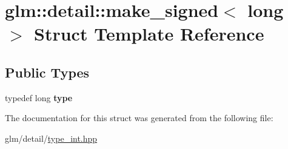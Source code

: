 \hypertarget{structglm_1_1detail_1_1make__signed_3_01long_01_4}{\section{glm\-:\-:detail\-:\-:make\-\_\-signed$<$ long $>$ Struct Template Reference}
\label{structglm_1_1detail_1_1make__signed_3_01long_01_4}
}
\subsection*{Public Types}
\begin{DoxyCompactItemize}
\item 
\hypertarget{structglm_1_1detail_1_1make__signed_3_01long_01_4_ab9807f0a681192166dd820195c967222}{typedef long {\bfseries type}}\label{structglm_1_1detail_1_1make__signed_3_01long_01_4_ab9807f0a681192166dd820195c967222}

\end{DoxyCompactItemize}


The documentation for this struct was generated from the following file\-:\begin{DoxyCompactItemize}
\item 
glm/detail/\hyperlink{type__int_8hpp}{type\-\_\-int.\-hpp}\end{DoxyCompactItemize}

